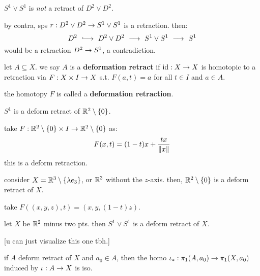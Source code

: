\begin{xmp}[source=Primary Source Material]
    $S^{1}\vee S^{1}$ is \textit{not} a retract of $D^{2}\vee D^{2}$.
\end{xmp}
by contra, sps $r:D^{2}\vee D^{2}\rightarrow S^{1}\vee S^{1}$ is a retraction. then:
\begin{equation*} %
    D^{2} \ \lhook\joinrel\longrightarrow \ D^{2}\vee D^{2} \ \gto \ S^{1}\vee S^{1} \ \gto \ S^{1}
\end{equation*}
would be a retraction $D^{2}\rightarrow S^{1}$, a contradiction.

\begin{defn}
    let $A\subseteq X$.
    we say $A$ is a \textbf{deformation retract} if $\textrm{id}:X\rightarrow X$ is homotopic to a retraction
    via $F:X\times I\rightarrow X$ s.t. $F(a,t)=a$ for all $t\in I$ and $a\in A$.

    the homotopy $F$ is called a \textbf{deformation retraction}.
\end{defn}

\begin{xmp}[source=Primary Source Material]
    $S^{1}$ is a deform retract of $\mathbb{R}^{2}\setminus\left\{{0}\right\}$.
\end{xmp}
take $F:\mathbb{R}^{2}\setminus\left\{{0}\right\}\times I\rightarrow\mathbb{R}^{2}\setminus\left\{{0}\right\}$ as:
\begin{equation*}
    F(x,t) = (1-t)x + \frac{tx}{\norm{x}}
\end{equation*}
this is a deform retraction.

\begin{xmp}[source=Primary Source Material]
    consider $X=\mathbb{R}^{3}\setminus\left\{{\lambda e_{3}}\right\}$, or $\mathbb{R}^{3}$ without the $z$-axis.
    then, $\mathbb{R}^{2}\setminus\left\{{0}\right\}$ is a deform retract of $X$.
\end{xmp}
take $F((x,y,z),t) = (x,y,(1-t)z)$.

\begin{xmp}[source=Primary Source Material]
    let $X$ be $\mathbb{R}^{2}$ minus two pts.
    then $S^{1}\vee S^{1}$ is a deform retract of $X$.
\end{xmp}
[u can just visualize this one tbh.]

\begin{prop}
    if $A$ deform retract of $X$ and $a_{0}\in A$, then the homo
    $\iota_{*}:\pi_{1}(A,a_{0})\rightarrow\pi_{1}(X,a_{0})$ induced by $\iota:A\rightarrow X$ is iso.
\end{prop}

